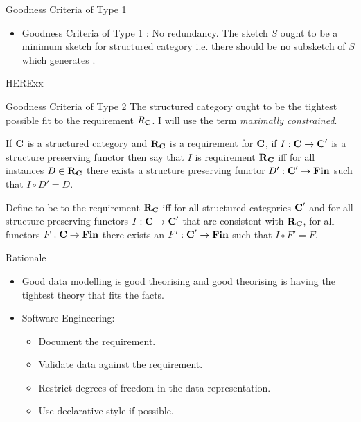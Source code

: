 \documentclass[xcolor=pst,dvips]{beamer}   %
\begin{document}
\begin{frame}{Goodness Criteria of Type 1}
\begin{itemize}
\item Goodness Criteria of Type 1 : No redundancy. The sketch $S$ ought to be a minimum sketch for structured
category \catcw i.e. there should be no subsketch of $S$ which generates  \catc.

\end{itemize}
HERExx
\end{frame}
\begin{frame}{Goodness Criteria of Type 2}
The structured category \catcw ought to be the tightest possible fit to the requirement $R_{\textbf{C}}$.
I will use the term \textit{maximally constrained}.
\begin{definition}
If $\textbf{C}$ is a structured category and $\textbf{R}_{\textbf{C}}$ is a requirement for $\textbf{C}$,  if $I: \textbf{C} \rightarrow \textbf{C}'$ is a structure preserving functor then say that $I$ is  requirement $\textbf{R}_{\textbf{C}}$ iff for all instances $D \in \textbf{R}_{\textbf{C}}$ 
there exists a structure preserving functor $D':\textbf{C}' \rightarrow \textbf{Fin}$ such that $I \circ D'=D$.
\end{definition}
\begin{definition}
Define \catcw to be  to the requirement $\textbf{R}_{\textbf{C}}$ iff for all 
structured categories $\textbf{C}'$ and for all structure preserving functors $I:\textbf{C} \rightarrow \textbf{C}'$ that are consistent with $\textbf{R}_{\textbf{C}}$, for all functors $F: \textbf{C} \rightarrow \textbf{Fin}$  there exists an $F' : \textbf{C}' \rightarrow \textbf{Fin}$ such that $I \circ F'=F$.
\end{definition}
\end{frame}

\begin{frame}{Rationale}
\begin{itemize}
\item Good data modelling is good theorising and good theorising is having the tightest theory that fits the facts.
\item Software Engineering: 
\begin{itemize}
\item Document the requirement.
\item Validate data against the requirement. 
\item Restrict degrees of freedom in the data representation.
\item Use declarative style if possible.
\end{itemize}
\end{itemize}
\end{frame}
\end{document}
